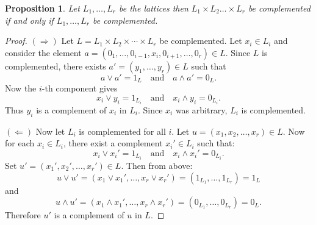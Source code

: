 \documentclass[11pt]{amsart}
\theoremstyle{plain}
\numberwithin{lemma}{\DefaultNumberTheoremWithin}
\numberwithin{claim}{\DefaultNumberTheoremWithin}
\numberwithin{theorem}{\DefaultNumberTheoremWithin}
\numberwithin{corollary}{\DefaultNumberTheoremWithin}
\newtheorem{proposition}{Proposition}
\numberwithin{proposition}{\DefaultNumberTheoremWithin}
\numberwithin{conjecture}{\DefaultNumberTheoremWithin}
\theoremstyle{definition}
\numberwithin{definition}{\DefaultNumberTheoremWithin}
\theoremstyle{definition}
\numberwithin{question}{\DefaultNumberTheoremWithin}
\theoremstyle{definition}
\numberwithin{problem}{\DefaultNumberTheoremWithin}
\theoremstyle{remark}
\numberwithin{remark}
     {\DefaultNumberTheoremWithin}
\theoremstyle{remark}
\numberwithin{example}{\DefaultNumberTheoremWithin}
\begin{document}
\begin{proposition}
     Let $L_1, \ldots, L_r$ be the lattices then $L_1 \times L_2 \ldots \times L_r$ be complemented if and only if $L_1, \ldots, L_r$ be complemented.
\end{proposition}

\begin{proof}
$(\Rightarrow)$  
Let $L=L_1 \times L_2 \times \cdots \times L_r$ be complemented. Let $x_i \in L_i$ and consider the element $a = (0_1, \dots, 0_{i-1}, x_i, 0_{i+1}, \dots, 0_r) \in L$.  
Since $L$ is complemented, there exists $a' = (y_1, \dots, y_r) \in L$ such that  
$$a \vee a' = 1_L \quad \text{and} \quad a \wedge a' = 0_L.$$  
Now the $i$-th component gives  
$$x_i \vee y_i = 1_{L_i} \quad \text{and} \quad x_i \wedge y_i = 0_{L_i}.$$  
Thus $y_i$ is a complement of $x_i$ in $L_i$. Since $x_i$ was arbitrary, $L_i$ is complemented.

$(\Leftarrow)$  
Now let $L_i$ is complemented for all $i$. Let $u = (x_1, x_2, \dots, x_r) \in L$.  
Now for each $x_i\in L_i$, there exist a complement $x_i' \in L_i$ such that:  
$$x_i \vee x_i' = 1_{L_i} \quad \text{and} \quad x_i \wedge x_i' = 0_{L_i}.$$  
Set $u' = (x_1', x_2', \dots, x_r') \in L$.  
Then from above:  
$$u \vee u' = (x_1 \vee x_1', \dots, x_r \vee x_r') = (1_{L_1}, \dots, 1_{L_r}) = 1_L$$  
and  
$$u \wedge u' = (x_1 \wedge x_1', \dots, x_r \wedge x_r') = (0_{L_1}, \dots, 0_{L_r}) = 0_L.$$  
Therefore $u'$ is a complement of $u$ in $L$. 

\end{proof}
\end{document}
